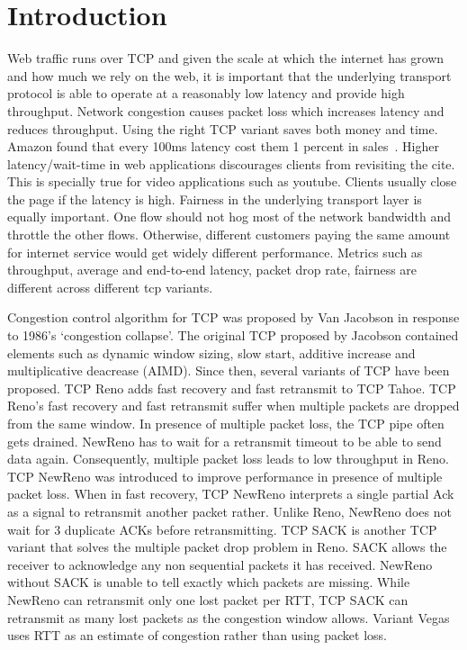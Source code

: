  \section{Introduction}\label{sec:introduction}
 Web traffic runs over TCP and given the scale at which the internet has grown and how much we rely on the web, it is important that the underlying transport protocol is able to operate at a reasonably low latency and provide high throughput. Network congestion causes packet loss which increases latency and reduces throughput. Using the right TCP variant saves both money and time. Amazon found that every 100ms latency cost them 1 percent in sales~\cite{kohavi_online_2007}. Higher latency/wait-time in web applications discourages clients from revisiting the cite. This is specially true for video applications such as youtube. Clients usually close the page if the latency is high. Fairness in the underlying transport layer is equally important. One flow should not hog most of the network bandwidth and throttle the other flows. Otherwise, different customers paying the same amount for internet service would get widely different performance. Metrics such as throughput, average and end-to-end latency, packet drop rate, fairness are different across different tcp variants. 

Congestion control algorithm for TCP was proposed by Van Jacobson in response to 1986's `congestion collapse'. The original TCP proposed by Jacobson contained elements such as dynamic window sizing, slow start, additive increase and multiplicative deacrease (AIMD). Since then, several variants of TCP have been proposed. TCP Reno adds fast recovery and fast retransmit to TCP Tahoe. TCP Reno's fast recovery and fast retransmit suffer when multiple packets are dropped from the same window. In presence of multiple packet loss, the TCP pipe often gets drained. NewReno has to wait for a retransmit timeout to be able to send data again. Consequently, multiple packet loss leads to low throughput in Reno. TCP NewReno was introduced to improve performance in presence of multiple packet loss. When in fast recovery, TCP NewReno interprets a single partial Ack as a signal to retransmit another packet rather. Unlike Reno, NewReno does not wait for 3 duplicate ACKs before retransmitting. TCP SACK is another TCP variant that solves the multiple packet drop problem in Reno. SACK allows the receiver to acknowledge any non sequential packets it has received. NewReno without SACK is unable to tell exactly which packets are missing. While NewReno can retransmit only one lost packet per RTT, TCP SACK can retransmit as many lost packets as the congestion window allows. Variant Vegas uses RTT as an estimate of congestion rather than using packet loss.

